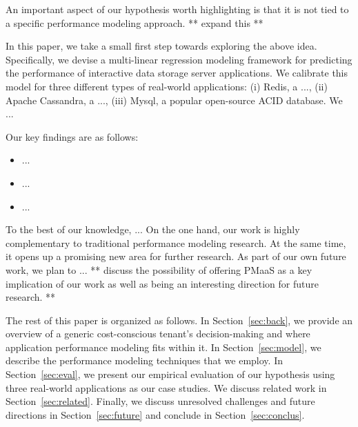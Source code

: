An important aspect of our hypothesis worth highlighting is that it is not tied to a specific performance modeling approach. ** expand this **

 In this paper, we take a small first step towards exploring the above idea. Specifically, we devise a multi-linear regression modeling framework for predicting the performance of interactive data storage server applications. We calibrate this model for three different types of real-world applications: (i) Redis, a ..., (ii) Apache Cassandra, a ..., (iii) Mysql, a popular open-source ACID database. We ... 

Our key findings are as follows:
\begin{itemize}
\item ...
\item ...
\item ...
\end{itemize}


To the best of our knowledge, ... On the one hand, our work is highly complementary to traditional performance modeling research. At the same time, it opens up a promising new area for further research. As part of our own future work, we plan to ... ** discuss the possibility of offering PMaaS as a key implication of our work as well as being an interesting direction for future research. **

The rest of this paper is organized as follows. In Section~\ref{sec:back}, we provide an overview of a generic cost-conscious tenant's decision-making and where application performance modeling fits within it.  In Section~\ref{sec:model}, we describe the performance modeling techniques that we employ.  In Section~\ref{sec:eval}, we present our empirical evaluation of our hypothesis using three real-world applications as our case studies. We discuss related work in Section~\ref{sec:related}.  Finally, we discuss unresolved challenges and future directions in Section~\ref{sec:future} and conclude in Section~\ref{sec:conclus}. 
 


 

